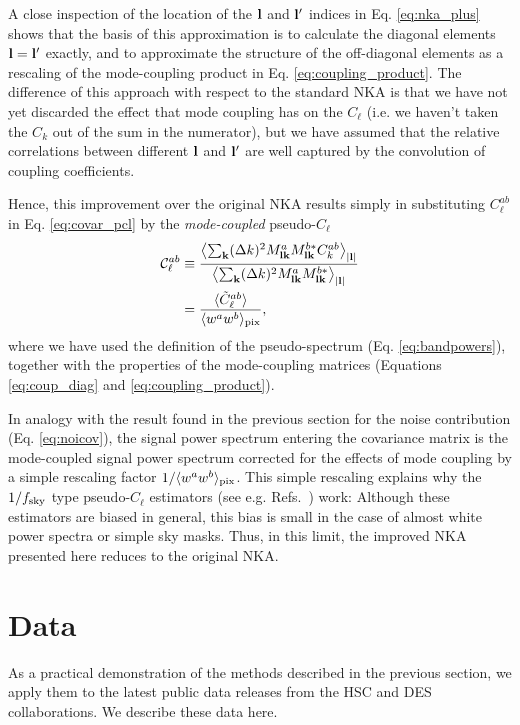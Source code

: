 \documentclass[a4paper,11pt]{article}
\begin{document}
        A close inspection of the location of the ${\bf l}$ and ${\bf l}'$ indices in Eq. \ref{eq:nka_plus} shows that the basis of this approximation is to calculate the diagonal elements ${\bf l}={\bf l}'$ exactly, and to approximate the structure of the  off-diagonal elements as a rescaling of the mode-coupling product in Eq. \ref{eq:coupling_product}. The difference of this approach with respect to the standard NKA is that we have not yet discarded the effect that mode coupling has on the $C_\ell$ (i.e. we haven't taken the $C_k$ out of the sum in the numerator), but we have assumed that the relative correlations between different ${\bf l}$ and ${\bf l}'$ are well captured by the convolution of coupling coefficients.
        
        Hence, this improvement over the original NKA results simply in substituting $C^{ab}_\ell$ in Eq. \ref{eq:covar_pcl} by the {\sl mode-coupled} pseudo-$C_\ell$
        \begin{align}\nonumber
          {\cal C}^{ab}_\ell &\equiv \frac{\left\langle\sum_{\bf k}(\Delta k)^2M^a_{{\bf l}{\bf k}}M^{b*}_{{\bf l}{\bf k}}C^{ab}_k\right\rangle_{|{\bf l}|}}{\left\langle\sum_{\bf k}(\Delta k)^2M^a_{{\bf l}{\bf k}}M^{b*}_{{\bf l}{\bf k}}\right\rangle_{|{\bf l}|}}\\\label{eq:sigcov}
          &=\frac{\langle \tilde{C}^{ab}_{\ell}\rangle}{\langle w^aw^b\rangle_{\rm pix}},
        \end{align}
        where we have used the definition of the pseudo-spectrum (Eq. \ref{eq:bandpowers}), together with the properties of the mode-coupling matrices (Equations \ref{eq:coup_diag} and \ref{eq:coupling_product}).
        
        In analogy with the result found in the previous section for the noise contribution (Eq. \ref{eq:noicov}), the signal power spectrum entering the covariance matrix is the mode-coupled signal power spectrum corrected for the effects of mode coupling by a simple rescaling factor $1/\langle w^aw^b\rangle_{\rm pix}$. This simple rescaling explains why the $1/f_{\rm sky}$ type pseudo-$C_\ell$ estimators (see e.g. Refs.~\cite{1973ApJ...185..413P,astro-ph/0105302}) work: Although these estimators are biased in general, this bias is small in the case of almost white power spectra or simple sky masks. Thus, in this limit, the improved NKA presented here reduces to the original NKA.

  \section{Data}\label{sec:data}
    As a practical demonstration of the methods described in the previous section, we apply them to the latest public data releases from the HSC and DES collaborations. We describe these data here.
\end{document}
